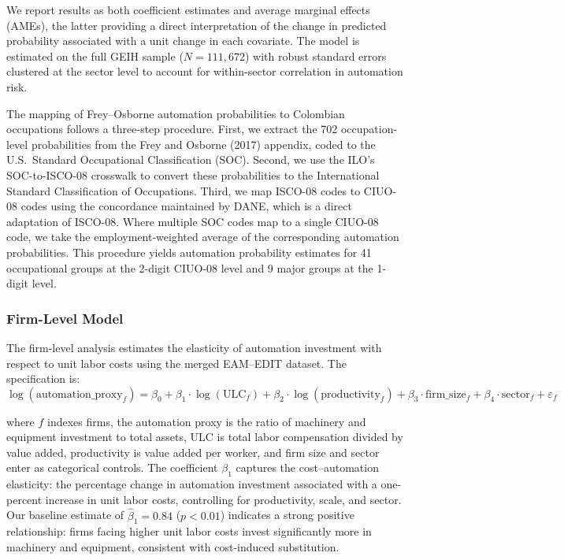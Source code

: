 We report results as both coefficient estimates and average marginal effects (AMEs), the latter providing a direct interpretation of the change in predicted probability associated with a unit change in each covariate. The model is estimated on the full GEIH sample ($N = 111{,}672$) with robust standard errors clustered at the sector level to account for within-sector correlation in automation risk.

The mapping of Frey--Osborne automation probabilities to Colombian occupations follows a three-step procedure. First, we extract the 702 occupation-level probabilities from the Frey and Osborne (2017) appendix, coded to the U.S.\ Standard Occupational Classification (SOC). Second, we use the ILO's SOC-to-ISCO-08 crosswalk to convert these probabilities to the International Standard Classification of Occupations. Third, we map ISCO-08 codes to CIUO-08 codes using the concordance maintained by DANE, which is a direct adaptation of ISCO-08. Where multiple SOC codes map to a single CIUO-08 code, we take the employment-weighted average of the corresponding automation probabilities. This procedure yields automation probability estimates for 41 occupational groups at the 2-digit CIUO-08 level and 9 major groups at the 1-digit level.

\subsubsection*{Firm-Level Model}

The firm-level analysis estimates the elasticity of automation investment with respect to unit labor costs using the merged EAM--EDIT dataset. The specification is:
\begin{equation}
\log(\text{automation\_proxy}_{f}) = \beta_0 + \beta_1 \cdot \log(\text{ULC}_{f}) + \beta_2 \cdot \log(\text{productivity}_{f}) + \beta_3 \cdot \text{firm\_size}_{f} + \beta_4 \cdot \text{sector}_{f} + \varepsilon_{f}
\label{eq:firm}
\end{equation}

\noindent where $f$ indexes firms, the automation proxy is the ratio of machinery and equipment investment to total assets, ULC is total labor compensation divided by value added, productivity is value added per worker, and firm size and sector enter as categorical controls. The coefficient $\beta_1$ captures the cost--automation elasticity: the percentage change in automation investment associated with a one-percent increase in unit labor costs, controlling for productivity, scale, and sector. Our baseline estimate of $\hat{\beta}_1 = 0.84$ ($p < 0.01$) indicates a strong positive relationship: firms facing higher unit labor costs invest significantly more in machinery and equipment, consistent with cost-induced substitution.

